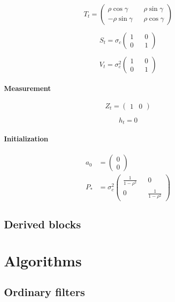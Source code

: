 \documentclass[
  letterpaper,
  DIV=11,
  numbers=noendperiod]{scrreprt}
\begin{document}
\[ T_t = \begin{pmatrix} \rho \cos{\gamma} &&   \rho \sin{\gamma}\\  -\rho \sin{\gamma}  && \rho \cos{\gamma}\end {pmatrix}\]

\[ S_t = \sigma_c \begin{pmatrix} 1 && 0\\  0  && 1\end {pmatrix} \]

\[ V_t = \sigma_c^2\begin{pmatrix} 1 && 0\\  0  && 1\end {pmatrix} \]

\subsection{Measurement}\label{measurement-1}

\[ Z_t = \begin{pmatrix} 1 & 0 \end{pmatrix}\]

\[ h_t = 0 \]

\subsection{Initialization}\label{initialization-6}

\[
\begin{align*}
a_0 &= \begin{pmatrix}0 \\ 0 \end{pmatrix} \\
P_{*} &=  \sigma_c^2\begin{pmatrix} \frac{1}{1-\rho^2} && 0\\  0  && \frac{1}{1-\rho^2}\end {pmatrix}
\end{align*}
\]

\chapter{Derived blocks}\label{derived-blocks}

\part{Algorithms}

\chapter{Ordinary filters}\label{ordinary-filters}
\end{document}

